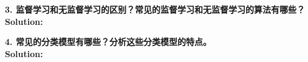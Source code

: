\documentclass{article}
\begin{document}
\pagebreak

\begin{homeworkProblem}
\textbf{3.	监督学习和无监督学习的区别？常见的监督学习和无监督学习的算法有哪些？}\\
\textbf{Solution:}\\
{\color{blue}

}


\end{homeworkProblem}
\pagebreak

\begin{homeworkProblem}
\textbf{4. 常见的分类模型有哪些？分析这些分类模型的特点。}\\
\textbf{Solution:}\\
{\color{blue}

}
\end{homeworkProblem}



\end{document}
